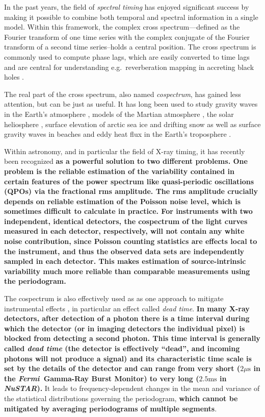 \documentclass[12pt]{emulateapj}
\newcommand{\project}[1]{\textsl{#1}}
\newcommand{\nustar}{\project{NuSTAR}\xspace}
\newcommand{\fermi}{\project{Fermi}\xspace}
\begin{document}
In the past years, the field of \textit{spectral timing} has enjoyed significant success by making it possible to combine both temporal and spectral information in a single model. Within this framework, the complex cross spectrum---defined as the Fourier transform of one time series with the complex conjugate of the Fourier transform of a second time series--holds a central position. The cross spectrum is commonly used to compute phase lags, which are easily converted to time lags and are central for understanding e.g.\ reverberation mapping in accreting black holes \citep[see][for a recent review]{uttley2014}. 

The real part of the cross spectrum, also named \textit{cospectrum}, has gained less attention, but can be just as useful. It has long been used to study gravity waves in the Earth's atmosphere \citep[e.g.][]{john2016}, models of the Martian atmosphere \citep[e.g.][]{wang2016}, the solar heliosphere \citep[e.g.][]{vigeesh2017}, surface elevation of arctic sea ice \citep[e.g.][]{ardhuin2016} and drifting snow \citep[e.g.][]{paterna2016} as well as surface gravity waves in beaches \citep[e.g.][]{fiedler2015} and eddy heat flux in the Earth's troposphere \citep[e.g.][]{wang2015,zurita-gotor2017}.

Within astronomy, and in particular the field of X-ray timing, it has recently been recognized \textbf{ as a powerful solution to two different problems. One problem is the reliable estimation of the variability contained in certain features of the power spectrum like quasi-periodic oscillations (QPOs) via the fractional rms amplitude. The rms amplitude crucially depends on reliable estimation of the Poisson noise level, which is sometimes difficult to calculate in practice. For instruments with two independent, identical detectors, the cospectrum of the light curves measured in each detector, respectively, will not contain any white noise contribution, since Poisson counting statistics are effects local to the instrument, and thus the observed data sets are independently sampled in each detector. This makes estimation of source-intrinsic variability much more reliable than comparable measurements using the periodogram.}

The cospectrum is also effectively used as as one approach to mitigate instrumental effects , in particular an effect called \textit{dead time}. \textbf{In many X-ray detectors, after detection of a photon there is a time interval during which the detector (or in imaging detectors the individual pixel) is blocked from detecting a second photon. This time interval is generally called \textit{dead time} (the detector is effectively ``dead'', and incoming photons will not produce a signal) and its characteristic time scale is set by the details of the detector and can range from very short ($2\mu\mathrm{s}$ in the \fermi\ Gamma-Ray Burst Monitor) to very long ($2.5\mathrm{ms}$ in \nustar).} It leads to frequency-dependent changes in the mean and variance of the statistical distributions governing the periodogram, \textbf{which cannot be mitigated by averaging periodograms of multiple segments}.
\end{document}
